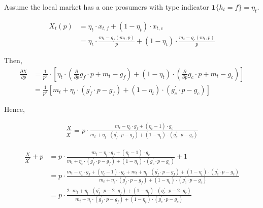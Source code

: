 \documentclass[american]{scrartcl}
\begin{document}
	Assume the local market has a one prosumers with type indicator $\mathbf{1}\{h_t = f\} = \eta_t$.

	\begin{equation}
		\begin{split}
			X_t(p) &= \eta_t \cdot x_{t, f} + (1 - \eta_t) \cdot x_{t, c} \\
			&= \eta_t \cdot \frac{m_t - g_f(m_t, p)}{p} + (1 - \eta_t) \cdot \frac{m_t - g_c(m_t, p)}{p}
		\end{split}
	\end{equation}


	Then,
	\begin{equation}
		\begin{split}
			\frac{\partial X}{\partial p} &= \frac{1}{p^2} \cdot \left[ \eta_t \cdot \left(\frac{\partial}{\partial p} g_f \cdot p + m_t - g_f \right) + (1 - \eta_t) \cdot \left(\frac{\partial}{\partial p} g_c \cdot p + m_t - g_c \right) \right] \\
			&=\frac{1}{p^2} \left[m_t + \eta_t \cdot \left( g^\prime_f \cdot p - g_f \right) + (1 - \eta_t) \cdot \left( g^\prime_c \cdot p - g_c \right) \right]
		\end{split}
	\end{equation}

	Hence,

	\begin{equation}
		\begin{split}
			\frac{X}{X^\prime} = p \cdot \frac{m_t - \eta_t \cdot g_f + (\eta_t - 1) \cdot g_c}{m_t + \eta_t \cdot ( g^\prime_f \cdot p - g_f ) + (1 - \eta_t) \cdot (g^\prime_c \cdot p - g_c)}
		\end{split}
	\end{equation}

	\begin{equation}
		\begin{split}
			\frac{X}{X^\prime} + p &= p \cdot \frac{m_t - \eta_t \cdot g_f + (\eta_t - 1) \cdot g_c}{m_t + \eta_t \cdot ( g^\prime_f \cdot p - g_f ) + (1 - \eta_t) \cdot (g^\prime_c \cdot p - g_c)} + 1 \\
			&= p \cdot  \frac{m_t - \eta_t \cdot g_f + (\eta_t - 1) \cdot g_c + m_t + \eta_t \cdot ( g^\prime_f \cdot p - g_f ) + (1 - \eta_t) \cdot (g^\prime_c \cdot p - g_c)}{m_t + \eta_t \cdot ( g^\prime_f \cdot p - g_f ) + (1 - \eta_t) \cdot (g^\prime_c \cdot p - g_c)} \\
			&= p \cdot \frac{2 \cdot m_t + \eta_t \cdot (g^\prime_f \cdot p - 2\cdot g_f) + (1 - \eta_t) \cdot (g^\prime_c \cdot p - 2\cdot g_c)}{m_t + \eta_t \cdot ( g^\prime_f \cdot p - g_f ) + (1 - \eta_t) \cdot (g^\prime_c \cdot p - g_c)}
		\end{split}
	\end{equation}
\end{document}
